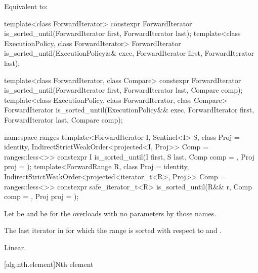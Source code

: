 \begin{itemdescr}
\pnum
\effects
Equivalent to:
\end{itemdescr}

%
\begin{itemdecl}
template<class ForwardIterator>
  constexpr ForwardIterator
    is_sorted_until(ForwardIterator first, ForwardIterator last);
template<class ExecutionPolicy, class ForwardIterator>
  ForwardIterator
    is_sorted_until(ExecutionPolicy&& exec,
                    ForwardIterator first, ForwardIterator last);

template<class ForwardIterator, class Compare>
  constexpr ForwardIterator
    is_sorted_until(ForwardIterator first, ForwardIterator last,
                    Compare comp);
template<class ExecutionPolicy, class ForwardIterator, class Compare>
  ForwardIterator
    is_sorted_until(ExecutionPolicy&& exec,
                    ForwardIterator first, ForwardIterator last,
                    Compare comp);

namespace ranges {
  template<ForwardIterator I, Sentinel<I> S, class Proj = identity,
           IndirectStrictWeakOrder<projected<I, Proj>> Comp = ranges::less<>>
    constexpr I is_sorted_until(I first, S last, Comp comp = {}, Proj proj = {});
  template<ForwardRange R, class Proj = identity,
           IndirectStrictWeakOrder<projected<iterator_t<R>, Proj>> Comp = ranges::less<>>
    constexpr safe_iterator_t<R>
      is_sorted_until(R&& r, Comp comp = {}, Proj proj = {});
}
\end{itemdecl}

\begin{itemdescr}
\pnum
Let  be 
and  be 
for the overloads with no parameters by those names.

\pnum
\returns
The last iterator  in 
for which the range 
is sorted with respect to  and .

\pnum
\complexity
Linear.
\end{itemdescr}

[alg.nth.element]{Nth element}

